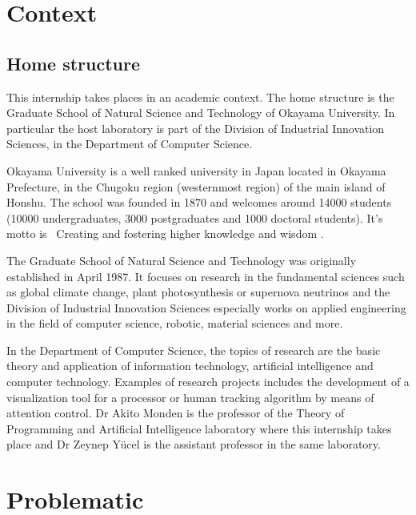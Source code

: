 \documentclass[12pt,a4paper,twoside]{article}
\begin{document}
\tableofcontents

\newpage

\section{Context}

\subsection{Home structure}
This internship takes places in an academic context. The home structure is the Graduate School of Natural Science and Technology of Okayama University. In particular the host laboratory is part of the Division of Industrial Innovation Sciences, in the Department of Computer Science.

Okayama University is a well ranked university in Japan located in Okayama Prefecture, in the Chugoku region (westernmost region) of the main island of Honshu. The school was founded in 1870 and welcomes around 14000 students (10000 undergraduates, 3000 postgraduates and 1000 doctoral students). It's motto is \guillemotleft~Creating and fostering higher knowledge and wisdom \guillemotright.

The Graduate School of Natural Science and Technology was originally established in April 1987. It focuses on research in the fundamental sciences such as global climate change, plant photosynthesis or supernova neutrinos and the Division of Industrial Innovation Sciences especially works on applied engineering in the field of computer science, robotic, material sciences and more. 

In the Department of Computer Science, the topics of research are the basic theory and application of information technology, artificial intelligence and computer technology. Examples of research projects includes the development of a visualization tool for a processor or human tracking algorithm by means of attention control. Dr Akito Monden is the professor of the Theory of Programming and Artificial Intelligence laboratory where this internship takes place and Dr Zeynep Yücel is the assistant professor in the same laboratory. 

\section{Problematic}
\end{document}
